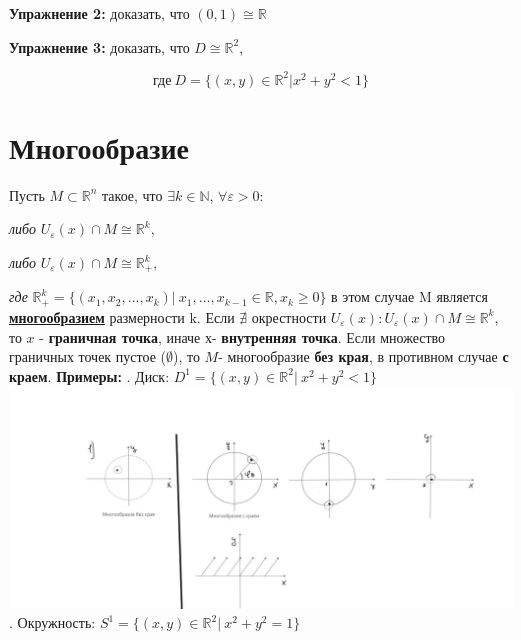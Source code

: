 \documentclass[12pt,a4paper]{article}
\begin{document}
	\textbf{\large{Упражнение 2:}} доказать, что $(0,1) \cong  \mathbb{R}$
	
	\textbf{\large{Упражнение 3:}} доказать, что $D\cong \mathbb{R}^2$,
	
	\[ \textit{где}~ D =\{(x,y)\in \mathbb{R}^2 | x^2 + y^2 < 1\} \]
	
	\newpage
\section*{Многообразие}

Пусть \(M \subset \mathbb{R}^n\) такое, что \(\exists k\in \mathbb{N}\), $\forall \varepsilon >0$:
\begin{center}
 \textit{либо} \(U_{\varepsilon} (x)\cap M \cong \mathbb{R}^k\),
\end{center}
\begin{center}
 \textit{либо} \(U_{\varepsilon} (x)\cap M \cong \mathbb{R}_{+}^k\),
\end{center}
\textit{где} \(\mathbb{R}_{+}^k = \{(x_1,x_2,...,x_k)|~ x_1,..., x_{k-1} \in \mathbb{R}, x_k\ge 0\}\)
\newline в этом случае M является \underline{\textbf{многообразием}} размерности k.
\newline Если \(\nexists\) окрестности \(U_{\varepsilon} (x): U_{\varepsilon} (x)\cap M \cong \mathbb{R}^k\), то \(x\) - \textbf{граничная точка}, иначе \(х\)- \textbf{внутренняя точка}.
\newline Если множество граничных точек пустое (\(\emptyset\)), то \(M\)- многообразие \textbf{без края}, в противном случае \textbf{с краем}.
\newline \textbf{Примеры:}
. Диск: $D^1 = \{(x,y) \in \mathbb{R}^2 |~ x^2 + y^2 < 1 \} $
\newline \includegraphics[scale=0.7]{image1.jpg}
. Окружность: \(S^1 = \{(x,y)\in \mathbb{R}^2|~ x^2 + y^2 =1\}\) 
\end{document}
